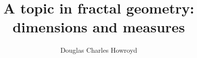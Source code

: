 \documentclass[a4paper]{report}
\title{A topic in fractal geometry:\\
       dimensions and measures}
\author{Douglas Charles Howroyd}
\theoremstyle{definition}
\begin{document}
 \null \newpage
 


\onehalfspacing



\singlespacing
\tableofcontents
\onehalfspacing

\begin{large}









\end{large}


\singlespacing
\printnomenclature
\clearpage
{}
\onehalfspacing

\singlespacing


\end{document}
